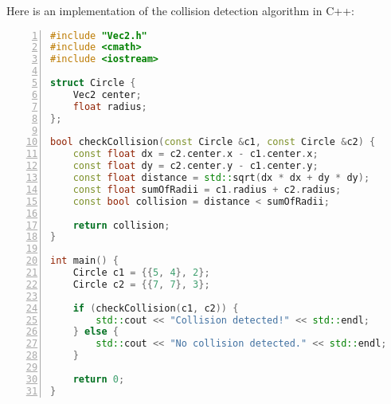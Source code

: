 \newpage
{}
Here is an implementation of the collision detection algorithm in C++:
\vspace{1em}
\begin{mdframed}[linecolor=black!30!white,linewidth=.5pt,extratopheight=3em]
    \begin{lstlisting}[language=C++, aboveskip=3mm,
        belowskip=3mm,
        showstringspaces=false,
        columns=flexible,
        basicstyle={\small\ttfamily},
        numbers=left,
        numberstyle=\tiny\color{gray},
        keywordstyle=\color{blue},
        commentstyle=\color{dkgreen},
        stringstyle=\color{mauve},
        breaklines=true,
        breakatwhitespace=true,
        tabsize=3,
        xleftmargin=1em]
#include "Vec2.h"
#include <cmath>
#include <iostream>

struct Circle {
    Vec2 center;
    float radius;
};

bool checkCollision(const Circle &c1, const Circle &c2) {
    const float dx = c2.center.x - c1.center.x;
    const float dy = c2.center.y - c1.center.y;
    const float distance = std::sqrt(dx * dx + dy * dy);
    const float sumOfRadii = c1.radius + c2.radius;
    const bool collision = distance < sumOfRadii;

    return collision;
}

int main() {
    Circle c1 = {{5, 4}, 2};
    Circle c2 = {{7, 7}, 3};

    if (checkCollision(c1, c2)) {
        std::cout << "Collision detected!" << std::endl;
    } else {
        std::cout << "No collision detected." << std::endl;
    }

    return 0;
}
\end{lstlisting}

\end{mdframed}

\newpage
